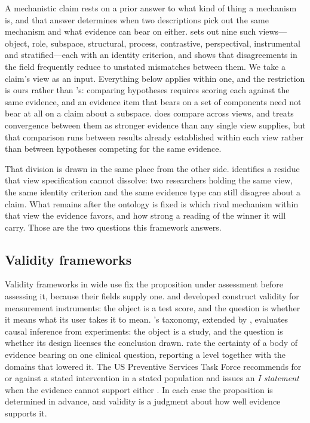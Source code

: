 \documentclass{article}
\begin{document}
 A mechanistic claim rests on a prior answer to what kind of thing a mechanism is, and that answer determines when two descriptions pick out the same mechanism and what evidence can bear on either. \citet{tower2026mechviews} sets out nine such views---object, role, subspace, structural, process, contrastive, perspectival, instrumental and stratified---each with an identity criterion, and shows that disagreements in the field frequently reduce to unstated mismatches between them. We take a claim's view as an input. Everything below applies within one, and the restriction is ours rather than \citeauthor{tower2026mechviews}'s: comparing hypotheses requires scoring each against the same evidence, and an evidence item that bears on a set of components need not bear at all on a claim about a subspace. \citeauthor{tower2026mechviews} does compare across views, and treats convergence between them as stronger evidence than any single view supplies, but that comparison runs between results already established within each view rather than between hypotheses competing for the same evidence.

That division is drawn in the same place from the other side. \citeauthor{tower2026mechviews} identifies a residue that view specification cannot dissolve: two researchers holding the same view, the same identity criterion and the same evidence type can still disagree about a claim. What remains after the ontology is fixed is which rival mechanism within that view the evidence favors, and how strong a reading of the winner it will carry. Those are the two questions this framework answers.

\subsection{Validity frameworks}
\label{sec:related-frameworks}

Validity frameworks in wide use fix the proposition under assessment before assessing it, because their fields supply one. \citet{cronbach1955construct} and \citet{messick1995validity} developed construct validity for measurement instruments: the object is a test score, and the question is whether it means what its user takes it to mean. \citeauthor{campbell1963experimental}'s taxonomy, extended by \citet{shadish2002experimental}, evaluates causal inference from experiments: the object is a study, and the question is whether its design licenses the conclusion drawn. \citet{guyatt2008grade} rate the certainty of a body of evidence bearing on one clinical question, reporting a level together with the domains that lowered it. The US Preventive Services Task Force recommends for or against a stated intervention in a stated population and issues an \emph{I statement} when the evidence cannot support either \citep{uspstf2021}. In each case the proposition is determined in advance, and validity is a judgment about how well evidence supports it.
\end{document}
